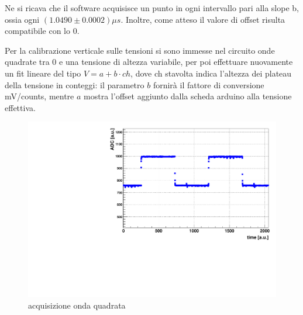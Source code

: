 \documentclass{article}
\begin{document}

Ne si ricava che il software acquisisce un punto in ogni intervallo pari alla slope b, ossia ogni $(1.0490 \pm 0.0002)\mu s$.
Inoltre, come atteso il valore di offset risulta compatibile con lo 0.

Per la calibrazione verticale sulle tensioni si sono immesse nel circuito onde quadrate tra 0 e una tensione di altezza variabile, 
per poi effettuare nuovamente un fit lineare del tipo $V = a + b \cdot ch$, dove ch stavolta indica l'altezza dei plateau della tensione 
in conteggi: il parametro $b$ fornirà il fattore di conversione mV/counts, mentre $a$ mostra l'offset aggiunto dalla scheda arduino alla tensione effettiva.

\begin{center}
\begin{figure}[H]
\centering
\includegraphics[scale=0.4, angle=0]{4_2.pdf}
\caption{acquisizione onda quadrata}
\label{fig:voltage_counts}
\end{figure}
\end{center}
\end{document}
